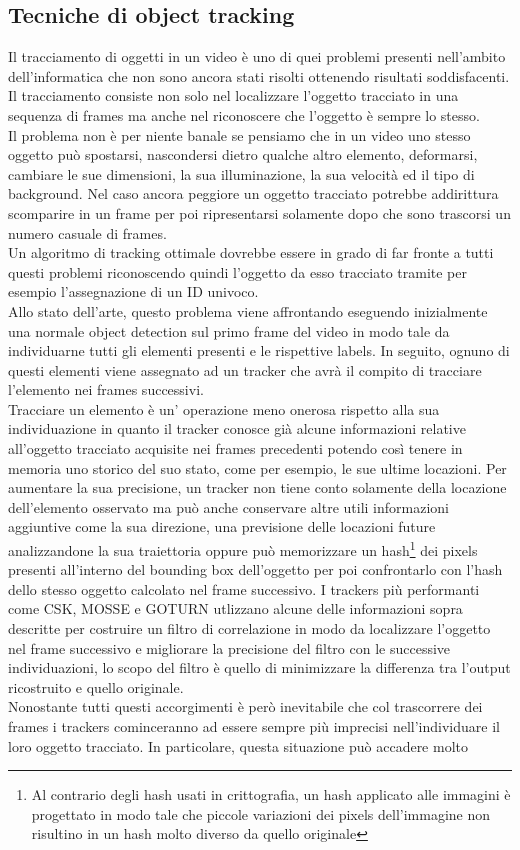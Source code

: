 \subsection{Tecniche di object tracking}
Il tracciamento di oggetti in un video è uno di quei problemi presenti nell'ambito dell'informatica che non sono ancora stati risolti ottenendo risultati soddisfacenti. Il tracciamento consiste non solo nel localizzare l'oggetto tracciato in una sequenza di frames ma anche nel riconoscere che l'oggetto è sempre lo stesso.\\ Il problema non è per niente banale se pensiamo che in un video uno stesso oggetto può spostarsi, nascondersi dietro qualche altro elemento, deformarsi, cambiare le sue dimensioni, la sua illuminazione, la sua velocità ed il tipo di background. Nel caso ancora peggiore un oggetto tracciato potrebbe addirittura scomparire in un frame per poi ripresentarsi solamente dopo che sono trascorsi un numero casuale di frames.\\ Un algoritmo di tracking ottimale dovrebbe essere in grado di far fronte a tutti questi problemi riconoscendo quindi l'oggetto da esso tracciato tramite per esempio l'assegnazione di un ID univoco.\\ Allo stato dell'arte, questo problema viene affrontando eseguendo inizialmente una normale object detection sul primo frame del video in modo tale da individuarne tutti gli elementi presenti e le rispettive labels. In seguito, ognuno di questi elementi viene assegnato ad un tracker che avrà il compito di tracciare l'elemento nei frames successivi.\\ Tracciare un elemento è un' operazione meno onerosa rispetto alla sua individuazione in quanto il tracker conosce già alcune informazioni relative all'oggetto tracciato acquisite nei frames precedenti potendo così tenere in memoria uno storico del suo stato, come per esempio, le sue ultime locazioni. Per aumentare la sua precisione, un tracker non tiene conto solamente della locazione dell'elemento  osservato ma può anche conservare altre utili informazioni aggiuntive come la sua direzione, una previsione delle locazioni future analizzandone la sua traiettoria oppure può memorizzare un hash\footnote{Al contrario degli hash usati in crittografia, un hash applicato alle immagini è progettato in modo tale che piccole variazioni dei pixels dell'immagine non risultino in un hash molto diverso da quello originale} dei pixels presenti all'interno del bounding box dell'oggetto per poi confrontarlo con l'hash dello stesso oggetto calcolato nel frame successivo. I trackers più performanti come CSK, MOSSE e GOTURN utlizzano alcune delle informazioni sopra descritte per costruire un filtro di correlazione in modo da localizzare l'oggetto nel frame successivo e migliorare la precisione del filtro con le successive individuazioni, lo scopo del filtro è quello di minimizzare la differenza tra l'output ricostruito e quello originale.\\ Nonostante tutti questi accorgimenti è però inevitabile che col trascorrere dei frames i trackers cominceranno ad essere sempre più imprecisi nell'individuare il loro oggetto tracciato. In particolare, questa situazione può accadere molto 
